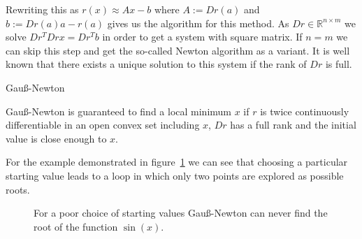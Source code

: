 Rewriting this as $r(x) \approx Ax - b$ where $A := Dr(a)$ and $b := Dr(a)a-r(a)$ gives us the algorithm for this method. As $Dr \in \mathds{R}^{n\times m}$ we solve $Dr^T Dr x = Dr^T b$ in order to get a system with square matrix. If $n=m$ we can skip this step and get the so-called Newton algorithm as a variant. It is well known that there exists a unique solution to this system if the rank of $Dr$ is full.

\begin{algorithm}[H] \label{alg:gauss_newton}
	\SetAlgoLined
	\DontPrintSemicolon
	\LinesNumbered
	\caption{Gauß-Newton}
	
	\BlankLine
\end{algorithm}

Gauß-Newton is guaranteed to find a local minimum $x$ if $r$ is twice continuously differentiable in an open convex set including $x$, $Dr$ has a full rank and the initial value is close enough to $x$.

For the example demonstrated in figure~\ref{fig:gauss_newton_fails_sin} we can see that choosing a particular starting value leads to a loop in which only two points are explored as possible roots.

\begin{figure}[h!]
	\centering
	\caption{For a poor choice of starting values Gauß-Newton can never find the root of the function $\sin(x)$.}
	\label{fig:gauss_newton_fails_sin}
\end{figure}

